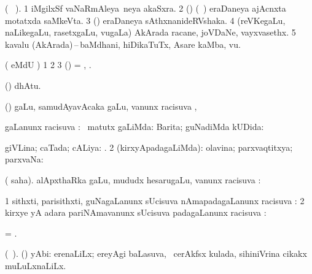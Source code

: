 \bentry
{} 
\gl{\nA} 
\bmng
(\bava\  ). 
\bnum
\num{1} iMgilxSf vaNaRmAleya \,neya akaSxra. 
\num{2} (\biVga) (\sA\ )  eraDaneya ajAcnxta motatxda saMkeVta. 
\num{3} (\jAyx) eraDaneya sAthxnanideRVshaka. 
\num{4} (reVKegaLu, naLikegaLu, rasetxgaLu, \mo vugaLa)  AkArada racane, joVDaNe, vayxvasethx. 
\num{5} kavalu (AkArada)\,--\,baMdhani, hiDikaTuTx, Asare kaMba, 
\enum
\mo vu.
\emng
\eentry

\bentry
{} 
\gl{\saMkiSx}
\bmng
( eMdU \parx) 
\bnum
\num{1}  
\num{2}  
\num{3} (\ame) = , .
\enum
\emng
\eentry

\bentry
{} 
\gl{\saMkeV}  
\bmng
(\ravi)  dhAtu.
\emng
\eentry

\bentry
{} 
\gl{\saMkiSx} 
\bmng
{}
\emng
\eentry

\bentry
{} 
\gl{}   
\bmng
\pUparx (\pArxparx) \BUkaq gaLu, samudAyavAcaka \nA gaLu, \mo vanunx racisuva \pUparx, \udA\   
\emng
\eentry

\bentry
{}  
\gl{\uparx}
\bmng
\gu gaLanunx racisuva \uparx: 
\bnum
{} \nA\ matutx \gu gaLiMda: 
\banum
{} Barita; guNadiMda kUDida:  

  giVLina; caTada; cALiya: . 
\eanum
\numie
\num{2} (kirxyApadagaLiMda): olavina; parxvaqtitxya; parxvaNa: 
\enum
\emng
\eentry

\bentry
{} 
\gl{\uparx} 
\bmng
( saha). alApxthaRka \nA gaLu, mududx hesarugaLu, \mo vanunx racisuva \uparx: 
\emng
\eentry

\bentry
{} 
\gl{\uparx}
\bmng
\bnum
\num{1} sithxti, parisithxti, guNagaLanunx sUcisuva  nAmapadagaLanunx racisuva \uparx:   
\num{2} kirxye yA adara pariNAmavanunx sUcisuva padagaLanunx racisuva \uparx: 
\enum
\emng
\eentry


\bentry
{} 
\gl{\nA}
\bmng
= .
\emng
\eentry

\bentry
{} 
\gl{\nA} 
\bmng
(\bava\ ). (\AseTxrXV) yAbi:
\banum
{}  erenaLiLx; ereyAgi baLasuva, \kanmu\ cerAkfsx kulada, sihiniVrina  cikakx muLuLxnaLiLx. 

